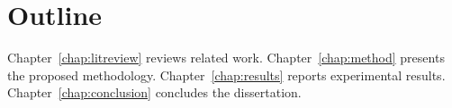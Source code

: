 \section{Outline}
\label{sec:outline}

Chapter~\ref{chap:litreview} reviews related work.
Chapter~\ref{chap:method} presents the proposed methodology.
Chapter~\ref{chap:results} reports experimental results.
Chapter~\ref{chap:conclusion} concludes the dissertation.
